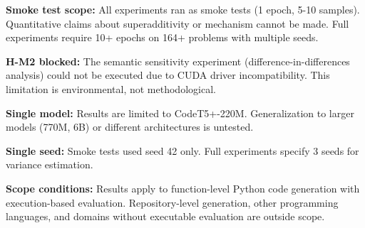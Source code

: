 
\textbf{Smoke test scope:} All experiments ran as smoke tests (1 epoch, 5-10 samples). Quantitative claims about superadditivity or mechanism cannot be made. Full experiments require 10+ epochs on 164+ problems with multiple seeds.

\textbf{H-M2 blocked:} The semantic sensitivity experiment (difference-in-differences analysis) could not be executed due to CUDA driver incompatibility. This limitation is environmental, not methodological.

\textbf{Single model:} Results are limited to CodeT5+-220M. Generalization to larger models (770M, 6B) or different architectures is untested.

\textbf{Single seed:} Smoke tests used seed 42 only. Full experiments specify 3 seeds for variance estimation.

\textbf{Scope conditions:} Results apply to function-level Python code generation with execution-based evaluation. Repository-level generation, other programming languages, and domains without executable evaluation are outside scope.
